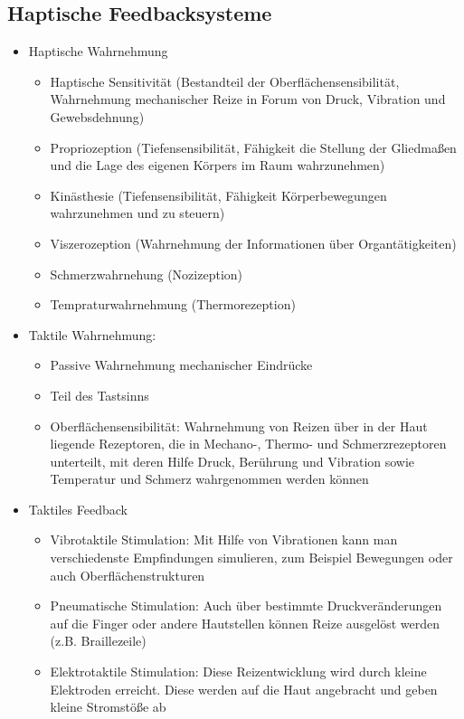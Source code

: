 \documentclass[paper=a4, fontsize=11pt]{scrartcl} %
\numberwithin{equation}{section} %
\numberwithin{figure}{section} %
\numberwithin{table}{section} %
\begin{document}
\subsection{Haptische Feedbacksysteme}

\begin{itemize}
\item Haptische Wahrnehmung
\begin{itemize}
\item Haptische Sensitivität (Bestandteil der Oberflächensensibilität, Wahrnehmung mechanischer Reize in Forum von Druck, Vibration und Gewebsdehnung)
\item Propriozeption (Tiefensensibilität, Fähigkeit die Stellung der Gliedmaßen und die Lage des eigenen Körpers im Raum wahrzunehmen)
\item Kinästhesie (Tiefensensibilität, Fähigkeit Körperbewegungen wahrzunehmen und zu steuern)
\item Viszerozeption (Wahrnehmung der Informationen über Organtätigkeiten)
\item Schmerzwahrnehung (Nozizeption)
\item Tempraturwahrnehmung (Thermorezeption)
\end{itemize}
\item Taktile Wahrnehmung: 
\begin{itemize}
\item Passive Wahrnehmung mechanischer Eindrücke
\item Teil des Tastsinns
\item Oberflächensensibilität: Wahrnehmung von Reizen über in der Haut liegende Rezeptoren, die in Mechano-, Thermo- und Schmerzrezeptoren unterteilt, mit deren Hilfe Druck, Berührung und Vibration sowie Temperatur und Schmerz wahrgenommen werden können
\end{itemize}
\item Taktiles Feedback
\begin{itemize}
\item Vibrotaktile Stimulation: Mit Hilfe von Vibrationen kann man verschiedenste Empfindungen simulieren, zum Beispiel Bewegungen oder auch Oberflächenstrukturen
\item Pneumatische Stimulation: Auch über bestimmte Druckveränderungen auf die Finger oder andere Hautstellen können Reize ausgelöst werden (z.B. Braillezeile)
\item Elektrotaktile Stimulation: Diese Reizentwicklung wird durch kleine Elektroden erreicht. Diese werden auf die Haut angebracht und geben kleine Stromstöße ab

\end{itemize}
\end{itemize}
\end{document}
